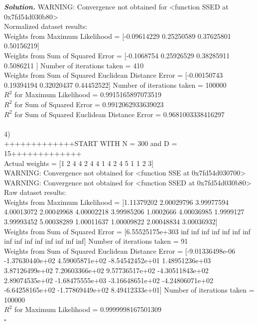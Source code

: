 \documentclass[8pt]{article}
\newenvironment{solution}[1][\it{Solution}]{\textbf{#1. } }{$\square$}
\begin{document}
\begin{solution}
WARNING: Convergence not obtained for <function SSED at 0x7fd54d030b80>\\
Normalized dataset results:\\
Weights from Maximum Likelihood = [-0.09614229  0.25250589  0.37625801  0.50156219] \\
Weights from Sum of Squared Error = [-0.1068754   0.25926529  0.38285911  0.5086211 ] Number of iterations taken =  410 \\
Weights from Sum of Squared Euclidean Distance Error = [-0.00150743  0.19394194  0.32020437  0.44452522] Number of iterations taken =  100000 \\
$R^2$ for Maximum Likelihood = 0.9915165897073519 \\
$R^2$ for Sum of Squared Error = 0.9912062933639023 \\
$R^2$ for Sum of Squared Euclidean Distance Error = 0.9681003338416297 \\
\\
4)\\
+++++++++++++START WITH N = 300 and D = 15+++++++++++++\\
Actual weights =  [1 2 4 4 2 4 4 1 4 2 4 5 1 1 2 3] \\
WARNING: Convergence not obtained for <function SSE at 0x7fd54d030700>\\
WARNING: Convergence not obtained for <function SSED at 0x7fd54d030b80>\\
Raw dataset results:\\
Weights from Maximum Likelihood = [1.11379202 2.00029796 3.99977594 4.00013072 2.00049968 4.00002218
 3.99985206 1.0002666  4.00036985 1.9999127  3.99993452 5.00038289
 1.00011637 1.00009822 2.00048834 3.00036932] \\
Weights from Sum of Squared Error = [6.55525175e+303             inf             inf             inf
             inf             inf             inf             inf
             inf             inf             inf             inf
             inf             inf             inf             inf] Number of iterations taken =  91 \\
Weights from Sum of Squared Euclidean Distance Error = [-9.01336498e-06 -1.37630440e+02  4.59005871e+02 -8.54542452e+01
  1.48951236e+03  3.87126499e+02  7.20603366e+02  9.57736517e+02
 -4.30511843e+02  2.89074535e+02 -1.68475555e+03 -3.16648651e+02
 -4.24806071e+02 -6.64258165e+02 -1.77869449e+02  8.49412333e+01] Number of iterations taken =  100000 \\
$R^2$ for Maximum Likelihood = 0.9999998167501309 \\

\end{solution}
\end{document}
